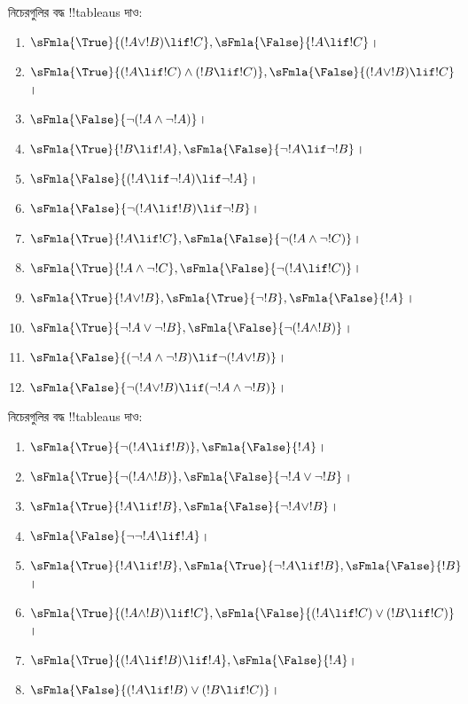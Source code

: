 \documentclass[../../../include/open-logic-section]{subfiles}
\begin{document}
\begin{prob}
নিচেরগুলির বদ্ধ !!{tableau}s দাও:
\begin{enumerate}
\item $\sFmla{\True}{(!A \lor !B) \lif !C}, \sFmla{\False}{!A \lif !C}$।
\item $\sFmla{\True}{(!A \lif !C) \land (!B \lif !C)}, \sFmla{\False}{(!A \lor !B) \lif !C}$।
\item $\sFmla{\False}{\lnot(!A \land \lnot !A)}$।
\item $\sFmla{\True}{!B \lif !A}, \sFmla{\False}{\lnot !A \lif \lnot !B}$।
\item $\sFmla{\False}{(!A \lif \lnot !A) \lif \lnot !A}$।
\item $\sFmla{\False}{\lnot(!A \lif !B) \lif \lnot !B}$।
\item $\sFmla{\True}{!A \lif !C}, \sFmla{\False}{\lnot (!A \land \lnot !C)}$।
\item $\sFmla{\True}{!A \land \lnot !C}, \sFmla{\False}{\lnot (!A \lif !C)}$।
\item $\sFmla{\True}{!A \lor !B}, \sFmla{\True}{\lnot !B}, \sFmla{\False}{!A}$।
\item $\sFmla{\True}{\lnot !A \lor \lnot !B}, \sFmla{\False}{\lnot(!A \land !B)}$।
\item $\sFmla{\False}{(\lnot !A \land \lnot !B) \lif\lnot(!A \lor !B)}$।
\item $\sFmla{\False}{\lnot(!A \lor !B) \lif (\lnot !A \land \lnot !B)}$।
\end{enumerate}
\end{prob}

\begin{prob}
নিচেরগুলির বদ্ধ !!{tableau}s দাও:
\begin{enumerate}
\item $\sFmla{\True}{\lnot(!A \lif !B)}, \sFmla{\False}{!A}$।
\item $\sFmla{\True}{\lnot(!A \land !B)}, \sFmla{\False}{\lnot !A \lor \lnot !B}$।
\item $\sFmla{\True}{!A \lif !B}, \sFmla{\False}{\lnot !A \lor !B}$।
\item $\sFmla{\False}{\lnot \lnot !A \lif !A}$।
\item $\sFmla{\True}{!A \lif !B}, \sFmla{\True}{\lnot !A \lif !B}, \sFmla{\False}{!B}$।
\item $\sFmla{\True}{(!A \land !B) \lif !C}, \sFmla{\False}{(!A \lif !C) \lor (!B \lif !C)}$।
\item $\sFmla{\True}{(!A \lif !B) \lif !A}, \sFmla{\False}{!A}$।
\item $\sFmla{\False}{(!A \lif !B) \lor (!B \lif !C)}$।
\end{enumerate}
\end{prob}
\end{document}
